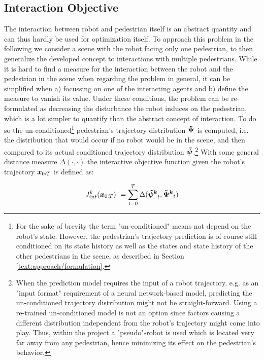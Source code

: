 \subsection{Interaction Objective}
\label{text:approach/objective/interactive}
The interaction between robot and pedestrian itself is an abstract quantity and can thus hardly be used for optimization itself. To approach this problem in the following we consider a scene with the robot facing only one pedestrian, to then generalize the developed concept to interactions with multiple pedestrians.  
\newline
While it is hard to find a measure for the interaction between the robot and the pedestrian in the scene when regarding the problem in general, it can be simplified when a) focussing on one of the interacting agents and b) define the measure to vanish its value. Under these conditions, the problem can be re-formulated as decreasing the disturbance the robot induces on the pedestrian, which is a lot simpler to quantify than the abstract concept of interaction. To do so the un-conditioned\footnote{For the sake of brevity the term "un-conditioned" means not depend on the robot's state. However, the pedestrian's trajectory prediction is of course still conditioned on its state history as well as the states and state history of the other pedestrians in the scene, as described in Section \ref{text:approach/formulation}.} pedestrian's trajectory distribution $\distwo[]$ is computed, i.e. the distribution that would occur if no robot would be in the scene, and then compared to its actual conditioned trajectory distribution $\dist[]$.\footnote{When the prediction model requires the input of a robot trajectory, e.g. as an "input format" requirement of a neural network-based model, predicting the un-conditioned trajectory distribution might not be straight-forward. Using a re-trained un-conditioned model is not an option since factors causing a different distribution independent from the robot's trajectory might come into play. Thus, within the project a "pseudo"-robot is used which is located very far away from any pedestrian, hence minimizing its effect on the pedestrian's behavior.} With some general distance measure $\Delta(\cdot, \cdot)$ the interactive objective function given the robot's trajectory $\boldsymbol{x}_{0:T}$ is defined as:

\begin{equation}
J_{int}^k(\x_{0:T}) = \sum_{t=0}^T \Delta(\dist[k]_t, \distwo[k]_t)
\label{eq:objective_interaction}
\end{equation}

